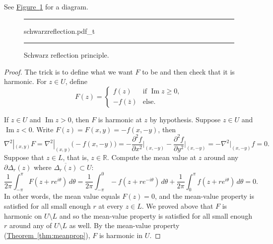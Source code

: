 \documentclass[12pt,openany]{book}
\renewcommand{\Im}{\operatorname{Im}}
\newcommand{\R}{{\mathbb{R}}}
\theoremstyle{plain}
\theoremstyle{remark}
\theoremstyle{definition}
\newenvironment{myfig}{%
\begin{figure}[h!t]
\noindent\rule{\textwidth}{0.5pt}\vspace{12pt}\par\centering}%
{\par\noindent\rule{\textwidth}{0.5pt}
\end{figure}}
\theoremstyle{exercise}
\theoremstyle{example}
\newcommand{\figureref}[1]{\hyperref[#1]{Figure~\ref*{#1}}}
\newcommand{\thmref}[1]{\hyperref[#1]{Theorem~\ref*{#1}}}
\begin{document}
See \figureref{fig:schwarzreflection} for a diagram.

\begin{myfig}
{schwarzreflection.pdf_t}
\caption{Schwarz reflection principle.\label{fig:schwarzreflection}}
\end{myfig}

\begin{proof}
The trick is to define what we want $F$ to be and then
check that it is harmonic.
For $z \in U$, define
\begin{equation*}
F(z) =
\begin{cases}
f(z) & \text{if } \Im z \geq 0, \\
-f(\bar{z}) & \text{else} .
\end{cases}
\end{equation*}

If $z \in U$ and $\Im z > 0$, then $F$ is harmonic at $z$ by hypothesis.
Suppose $z \in U$ and $\Im z < 0$.  Write $F(z) = F(x,y) = -f(x,-y)$, then
\begin{equation*}
\nabla^2|_{(x,y)} F
=
\nabla^2|_{(x,y)} \bigl( -f(x,-y) \bigr)
=
- \frac{\partial^2 f}{\partial x^2}\Big|_{(x,-y)}
- \frac{\partial^2 f}{\partial y^2}\Big|_{(x,-y)}
=
- \nabla^2|_{(x,-y)} f = 0 .
\end{equation*}
Suppose that $z \in L$, that is, $z \in \R$.
Compute the mean value at $z$ around any
$\partial \Delta_r(z)$ where $\overline{\Delta_r(z)} \subset U$:
\begin{equation*}
\frac{1}{2\pi} \int_{-\pi}^{\pi} F(z+re^{i\theta})\, d\theta
=
\frac{1}{2\pi} \int_{-\pi}^{0} -f(z+re^{-i\theta})\, d\theta
+
\frac{1}{2\pi} \int_{0}^{\pi} f(z+re^{i\theta})\, d\theta
=
0 .
\end{equation*}
In other words, the mean value equals $F(z) = 0$,
and the mean-value property is satisfied for all small enough
$r$ at every $z \in L$.
We proved above that $F$ is harmonic on $U \setminus L$ and
so the mean-value property
is satisfied for all small enough
$r$ around any of $U \setminus L$ as well.
By the mean-value property (\thmref{thm:meanprop}), $F$ is harmonic in $U$.
\end{proof}
\end{document}
